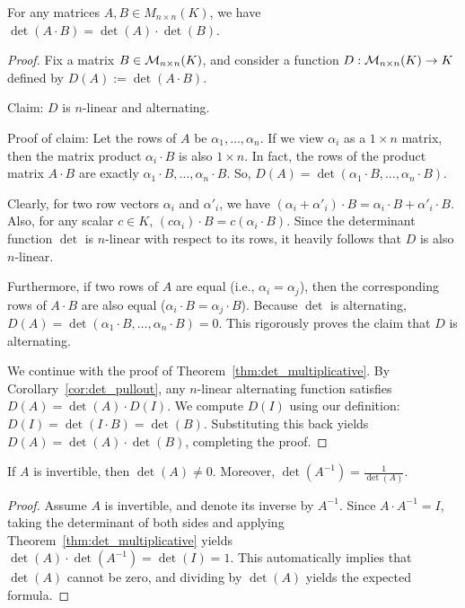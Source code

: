 \begin{theorem}
  \label{thm:det_multiplicative}
  For any matrices $A, B \in M_{n \times n}(K)$, we have $\det(A \cdot B) = \det(A) \cdot \det(B)$.
\end{theorem}

\begin{proof}
  Fix a matrix $B \in \mathcal{M}_{n \times n}(K)$, and consider a function $D : \mathcal{M}_{n \times n}(K) \to K$ defined by $D(A) := \det(A \cdot B)$.

  Claim: $D$ is $n$-linear and alternating.

  Proof of claim: Let the rows of $A$ be $\alpha_1, \dots, \alpha_n$. If we view $\alpha_i$ as a $1 \times n$ matrix, then the matrix product $\alpha_i \cdot B$ is also $1 \times n$. In fact, the rows of the product matrix $A \cdot B$ are exactly $\alpha_1 \cdot B, \dots, \alpha_n \cdot B$. So, $D(A) = \det(\alpha_1 \cdot B, \dots, \alpha_n \cdot B)$.

  Clearly, for two row vectors $\alpha_i$ and $\alpha'_i$, we have $(\alpha_i + \alpha'_i) \cdot B = \alpha_i \cdot B + \alpha'_i \cdot B$. Also, for any scalar $c \in K$, $(c\alpha_i) \cdot B = c(\alpha_i \cdot B)$. Since the determinant function $\det$ is $n$-linear with respect to its rows, it heavily follows that $D$ is also $n$-linear.

  Furthermore, if two rows of $A$ are equal (i.e., $\alpha_i = \alpha_j$), then the corresponding rows of $A \cdot B$ are also equal ($\alpha_i \cdot B = \alpha_j \cdot B$). Because $\det$ is alternating, $D(A) = \det(\alpha_1 \cdot B, \dots, \alpha_n \cdot B) = 0$. This rigorously proves the claim that $D$ is alternating.

  We continue with the proof of Theorem~\ref{thm:det_multiplicative}. By Corollary~\ref{cor:det_pullout}, any $n$-linear alternating function satisfies $D(A) = \det(A) \cdot D(I)$. We compute $D(I)$ using our definition: $D(I) = \det(I \cdot B) = \det(B)$. Substituting this back yields $D(A) = \det(A) \cdot \det(B)$, completing the proof.
\end{proof}

\begin{corollary}
  \label{cor:det_inverse}
  If $A$ is invertible, then $\det(A) \neq 0$. Moreover, $\det(A^{-1}) = \frac{1}{\det(A)}$.
\end{corollary}

\begin{proof}
  Assume $A$ is invertible, and denote its inverse by $A^{-1}$. Since $A \cdot A^{-1} = I$, taking the determinant of both sides and applying Theorem~\ref{thm:det_multiplicative} yields $\det(A) \cdot \det(A^{-1}) = \det(I) = 1$. This automatically implies that $\det(A)$ cannot be zero, and dividing by $\det(A)$ yields the expected formula.
\end{proof}


